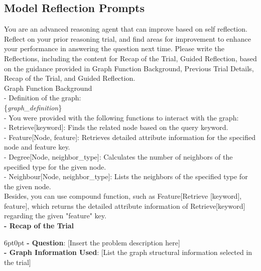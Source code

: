 \documentclass[11pt]{article}
\begin{document}
\subsection{Model Reflection Prompts}
\label{sec:appendixD2}

\begin{tcolorbox}[colback=white!10!white, colframe=blue!30!black, title=Reflection Prompts, boxrule=1pt]
\justifying
\noindent
You are an advanced reasoning agent that can improve based on self reflection. Reflect on your prior reasoning trial, and find areas for improvement to enhance your performance in answering the question next time. Please write the Reflections, including the content for Recap of the Trial, Guided Reflection, based on the guidance provided in Graph Function Background, Previous Trial Details, Recap of the Trial, and Guided Reflection.\\
Graph Function Background\\
- Definition of the graph: \\ \{\textit{graph}\_\textit{definition}\} \\
- You were provided with the following functions to interact with the graph:\\
  - Retrieve[keyword]: Finds the related node based on the query keyword.\\
  - Feature[Node, feature]: Retrieves detailed attribute information for the specified node and feature key.\\
  - Degree[Node, neighbor\_type]: Calculates the number of neighbors of the specified type for the given node.\\
  - Neighbour[Node, neighbor\_type]: Lists the neighbors of the specified type for the given node.\\
  Besides, you can use compound function, such as Feature[Retrieve [keyword], feature], which returns the detailed attribute information of Retrieve[keyword] regarding the given "feature" key.\\
\textbf{- Recap of the Trial}
\begin{adjustwidth}{6pt}{0pt}
    \textbf{- Question}: [Insert the problem description here]\\
    \textbf{- Graph Information Used}: [List the graph structural information selected in the trial]
\end{adjustwidth}
\end{tcolorbox}
\end{document}
